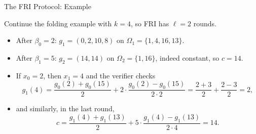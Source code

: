 \documentclass{zkdl-presentation-template}
\begin{document}
    \begin{frame}{The FRI Protocol: Example}
        \begin{example}
            Continue the folding example with $k = 4$, so FRI has $\ell = 2$ rounds.
            \begin{itemize}
                \item<2-> After $\beta_0 = 2$: $g_1 = (0, 2, 10, 8)$ on $\Omega_1 = \{1, 4, 16, 13\}$.
                \item<3-> After $\beta_1 = 5$: $g_2 = (14, 14)$ on $\Omega_2 = \{1, 16\}$, indeed constant, so $c = 14$.
                \item<4-> If $x_0 = 2$, then $x_1 = 4$ and the verifier checks
                \begin{equation*}
                    g_1(4) = \frac{g_0(2) + g_0(15)}{2} + 2 \cdot \frac{g_0(2) - g_0(15)}{2 \cdot 2} = \frac{2 + 3}{2} + \frac{2 - 3}{2} = 2,
                \end{equation*}
                \item<5-> and similarly, in the last round,
                \begin{equation*}
                    c = \frac{g_1(4) + g_1(13)}{2} + 5 \cdot \frac{g_1(4) - g_1(13)}{2 \cdot 4} = 14.
                \end{equation*}
            \end{itemize}
        \end{example}
    \end{frame}
\end{document}
